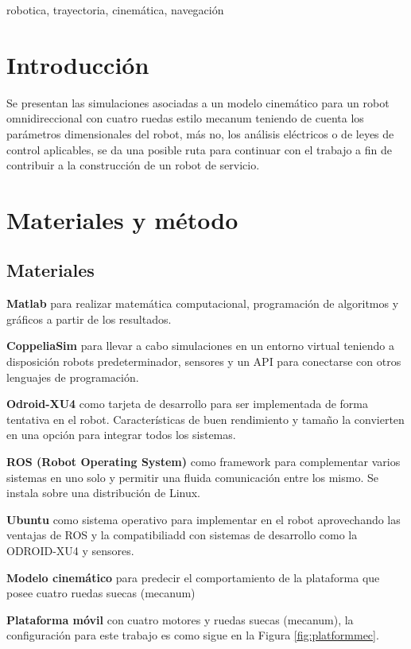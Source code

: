 \documentclass[conference]{IEEEtran}
\begin{document}
\begin{IEEEkeywords}
  robotica, trayectoria, cinemática, navegación
\end{IEEEkeywords}

\section{Introducción}
  Se presentan las simulaciones asociadas a un modelo cinemático para un robot omnidireccional 
  con cuatro ruedas estilo mecanum teniendo de cuenta los parámetros dimensionales del robot,
  más no, los análisis eléctricos o de leyes de control aplicables, se da una posible ruta
  para continuar con el trabajo a fin de contribuir a la construcción de un robot de
  servicio.
\section{Materiales y método}
\subsection{Materiales}
\textbf{Matlab} para realizar matemática computacional, programación de algoritmos y
gráficos a partir de los resultados.

\textbf{CoppeliaSim} para llevar a cabo simulaciones en un entorno virtual teniendo a
disposición robots predeterminador, sensores y un API para conectarse con otros
lenguajes de programación.

\textbf{Odroid-XU4} como tarjeta de desarrollo para ser implementada de forma
tentativa en el robot. Características de buen rendimiento y tamaño la convierten
en una opción para integrar todos los sistemas.

\textbf{ROS (Robot Operating System)} como framework para complementar varios
sistemas en uno solo y permitir una fluida comunicación entre los mismo. Se instala
sobre una distribución de Linux.

\textbf{Ubuntu} como sistema operativo para implementar en el robot aprovechando
las ventajas de ROS y la compatibiliadd con sistemas de desarrollo como la
ODROID-XU4 y sensores.

\textbf{Modelo cinemático} \cite{noauthor_modelo_nodate} para predecir el comportamiento de la plataforma que
posee cuatro ruedas suecas (mecanum)

\textbf{Plataforma móvil} con cuatro motores y ruedas suecas (mecanum), la configuración
para este trabajo es como sigue en la Figura \ref{fig:platformmec}.
\end{document}
